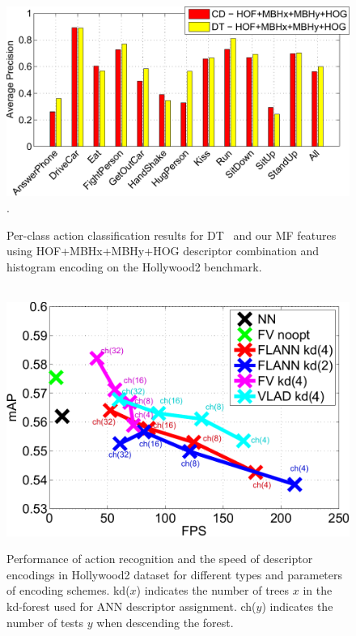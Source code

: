 \documentclass[10pt,twocolumn,letterpaper]{article}
\begin{document}
\begin{figure}
\begin{center}
\includegraphics[width=.9\linewidth]{figures/hollywood2-per-class-barplot-crop.pdf}.
\caption{Per-class action classification results for DT~\cite{Wang12} and our  MF features using HOF+MBHx+MBHy+HOG descriptor combination and histogram encoding on the Hollywood2 benchmark.\vspace{-.1cm}}
\label{fig:hwd2-barplot}
\end{center}
\end{figure}

\begin{figure}
\begin{center}
\mbox{}\vspace{-.4cm}\\
\includegraphics[width=.9\linewidth]{figures/hollywood2-flann-fps-map-crop-mod.pdf}
\caption{Performance of action recognition and the speed of descriptor encodings in Hollywood2 dataset for different types and parameters of encoding schemes. kd($x$) indicates the number of trees $x$ in the kd-forest used for ANN descriptor assignment. ch($y$) indicates the number of tests $y$ when descending the forest.\vspace{-.4cm}}
\label{fig:hwd2-flann}
\end{center}
\end{figure}
\end{document}
